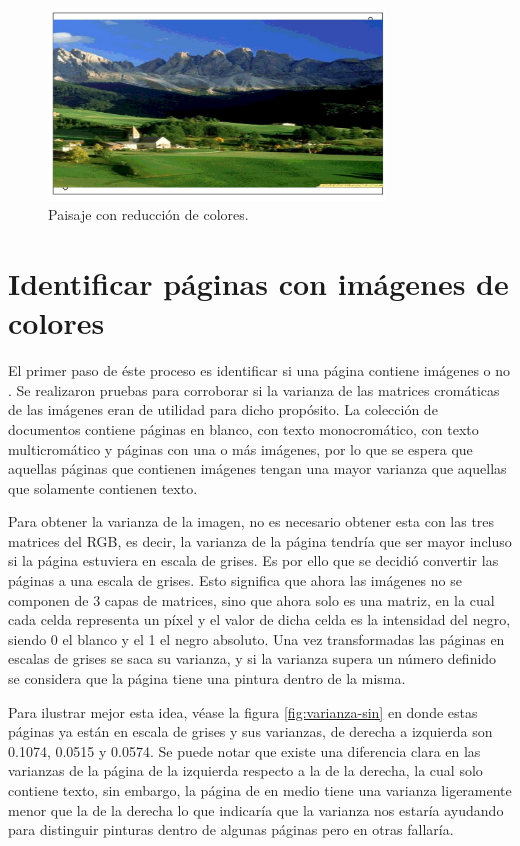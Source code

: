 \begin{figure}[H]
\centering
\includegraphics[width=0.8\textwidth]{Figures/paisaje_con.jpg}
\caption{Paisaje con reducción de colores.}
\label{fig:paisaje-con}
\end{figure}

\section{Identificar páginas con imágenes de colores}

El primer paso de éste proceso es  identificar  si una página contiene imágenes o no . Se realizaron pruebas para corroborar si la varianza de las matrices cromáticas de las imágenes eran de utilidad para dicho propósito. La colección de documentos contiene páginas en blanco, con texto monocromático, con texto multicromático y páginas con una o más imágenes, por lo que se espera que aquellas páginas que contienen imágenes tengan una mayor varianza que aquellas que solamente contienen texto. 


 Para obtener la varianza de la imagen, no es necesario obtener esta con las tres matrices del RGB, es decir, la varianza de la página tendría que ser mayor incluso si la página estuviera en escala de grises. Es por ello que se decidió convertir las páginas a una escala de grises. Esto significa que ahora las imágenes no se componen de 3 capas de matrices, sino que ahora solo es una matriz, en la cual cada celda representa un píxel y el valor de dicha celda es la intensidad del negro, siendo 0 el blanco y el 1 el negro absoluto. Una vez transformadas las páginas en escalas de grises se saca su varianza, y si la varianza supera un número definido se considera que la página tiene una pintura dentro de la misma.

Para ilustrar mejor esta idea, véase la figura \ref{fig:varianza-sin} en donde estas páginas ya están en escala de grises y sus varianzas, de derecha a izquierda son 0.1074, 0.0515 y 0.0574. Se puede notar que existe una diferencia clara en las varianzas de la página de la izquierda respecto a la de la derecha, la cual solo contiene texto, sin embargo, la página de en medio tiene una varianza ligeramente menor que la de la derecha lo que indicaría que la varianza nos estaría ayudando para distinguir pinturas dentro de algunas páginas pero en otras fallaría.


